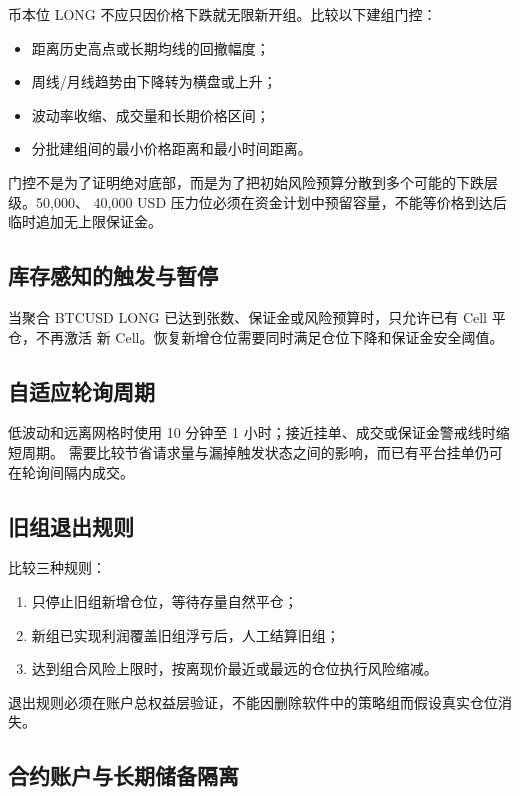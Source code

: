 \documentclass[11pt,a4paper,fontset=none]{ctexart}
\begin{document}
币本位 LONG 不应只因价格下跌就无限新开组。比较以下建组门控：

\begin{itemize}
  \item 距离历史高点或长期均线的回撤幅度；
  \item 周线/月线趋势由下降转为横盘或上升；
  \item 波动率收缩、成交量和长期价格区间；
  \item 分批建组间的最小价格距离和最小时间距离。
\end{itemize}

门控不是为了证明绝对底部，而是为了把初始风险预算分散到多个可能的下跌层级。50,000、
40,000 USD 压力位必须在资金计划中预留容量，不能等价格到达后临时追加无上限保证金。

\subsection{库存感知的触发与暂停}

当聚合 BTCUSD LONG 已达到张数、保证金或风险预算时，只允许已有 Cell 平仓，不再激活
新 Cell。恢复新增仓位需要同时满足仓位下降和保证金安全阈值。

\subsection{自适应轮询周期}

低波动和远离网格时使用 10 分钟至 1 小时；接近挂单、成交或保证金警戒线时缩短周期。
需要比较节省请求量与漏掉触发状态之间的影响，而已有平台挂单仍可在轮询间隔内成交。

\subsection{旧组退出规则}

比较三种规则：

\begin{enumerate}
  \item 只停止旧组新增仓位，等待存量自然平仓；
  \item 新组已实现利润覆盖旧组浮亏后，人工结算旧组；
  \item 达到组合风险上限时，按离现价最近或最远的仓位执行风险缩减。
\end{enumerate}

退出规则必须在账户总权益层验证，不能因删除软件中的策略组而假设真实仓位消失。

\subsection{合约账户与长期储备隔离}
\end{document}
